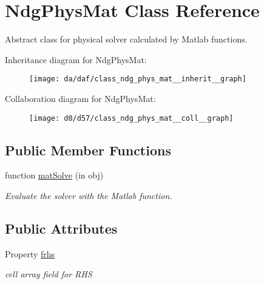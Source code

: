 \hypertarget{class_ndg_phys_mat}{}\section{Ndg\+Phys\+Mat Class Reference}
\label{class_ndg_phys_mat}


Abstract class for physical solver calculated by Matlab functions.  




Inheritance diagram for Ndg\+Phys\+Mat\+:
\nopagebreak
\begin{figure}[H]
\begin{center}
\leavevmode
\texttt{[image: da/daf/class\_ndg\_phys\_mat\_\_inherit\_\_graph]}
\end{center}
\end{figure}


Collaboration diagram for Ndg\+Phys\+Mat\+:
\nopagebreak
\begin{figure}[H]
\begin{center}
\leavevmode
\texttt{[image: d0/d57/class\_ndg\_phys\_mat\_\_coll\_\_graph]}
\end{center}
\end{figure}
\subsection*{Public Member Functions}
\begin{DoxyCompactItemize}
\item 
function \hyperlink{class_ndg_phys_mat_a57888659b30b21b3e9e1f9fd5b99d424}{mat\+Solve} (in obj)
\begin{DoxyCompactList}\small\item\em Evaluate the solver with the Matlab function. \end{DoxyCompactList}\end{DoxyCompactItemize}
\subsection*{Public Attributes}
\begin{DoxyCompactItemize}
\item 
Property \hyperlink{class_ndg_phys_mat_a74163a9cb1a8673733f495ce9eebeb59}{frhs}
\begin{DoxyCompactList}\small\item\em cell array field for R\+HS \end{DoxyCompactList}\end{DoxyCompactItemize}
